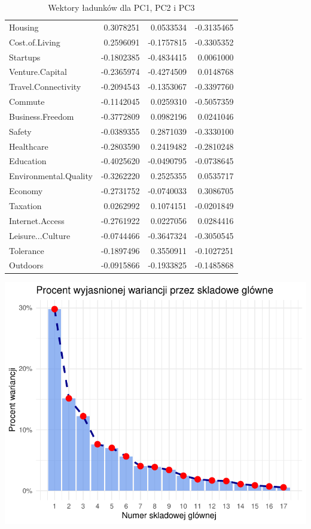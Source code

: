 \documentclass[
  12pt,
]{article}
\begin{document}
\begin{longtable}[t]{lrrr}
\caption{\label{tab:ladunki}Wektory ładunków dla PC1, PC2 i PC3}\\
\toprule
\cellcolor[HTML]{f2f2f2}{\textbf{}} & \cellcolor[HTML]{f2f2f2}{\textbf{PC1}} & \cellcolor[HTML]{f2f2f2}{\textbf{PC2}} & \cellcolor[HTML]{f2f2f2}{\textbf{PC3}}\\
\midrule
Housing & 0.3078251 & 0.0533534 & -0.3135465\\
Cost.of.Living & 0.2596091 & -0.1757815 & -0.3305352\\
Startups & -0.1802385 & -0.4834415 & 0.0061000\\
Venture.Capital & -0.2365974 & -0.4274509 & 0.0148768\\
Travel.Connectivity & -0.2094543 & -0.1353067 & -0.3397760\\
\addlinespace
Commute & -0.1142045 & 0.0259310 & -0.5057359\\
Business.Freedom & -0.3772809 & 0.0982196 & 0.0241046\\
Safety & -0.0389355 & 0.2871039 & -0.3330100\\
Healthcare & -0.2803590 & 0.2419482 & -0.2810248\\
Education & -0.4025620 & -0.0490795 & -0.0738645\\
\addlinespace
Environmental.Quality & -0.3262220 & 0.2525355 & 0.0535717\\
Economy & -0.2731752 & -0.0740033 & 0.3086705\\
Taxation & 0.0262992 & 0.1074151 & -0.0201849\\
Internet.Access & -0.2761922 & 0.0227056 & 0.0284416\\
Leisure...Culture & -0.0744466 & -0.3647324 & -0.3050545\\
\addlinespace
Tolerance & -0.1897496 & 0.3550911 & -0.1027251\\
Outdoors & -0.0915866 & -0.1933825 & -0.1485868\\
\bottomrule
\end{longtable}

\begin{center}\includegraphics{Sprawozdanie2_files/figure-latex/Zmiennosc_skladowych_w_PCA-1} \end{center}
\end{document}
